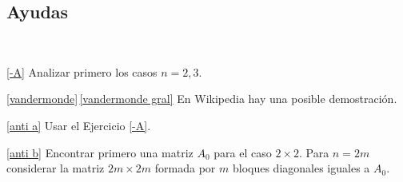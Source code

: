 \documentclass[a4paper,12pt,twoside,spanish,reqno]{amsbook}
\numberwithin{equation}{section}
\begin{document}
\subsection*{Ayudas}

\

\ref{-A} Analizar primero los casos $n=2,3$.


\ref{vandermonde}\,\ref{vandermonde gral} En Wikipedia hay una posible demostración.


\ref{anti a} Usar el Ejercicio \ref{-A}.


\ref{anti b} Encontrar primero una matriz $A_0$ para el caso $2\times 2$. Para $n = 2m$ considerar la matriz $2m \times 2m$ formada por $m$ bloques diagonales iguales a $A_0$.
\end{document}
